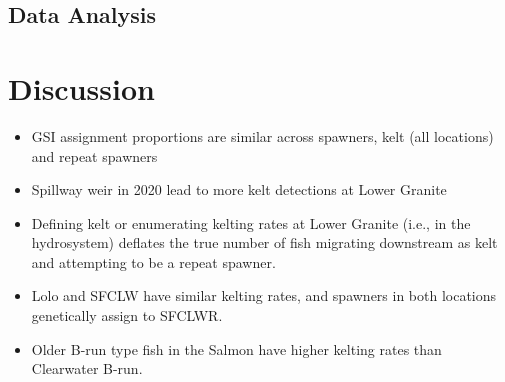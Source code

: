 \documentclass[11pt,a4paper,]{article}
\providecommand{\tightlist}{%
  \setlength{\itemsep}{0pt}\setlength{\parskip}{0pt}}
\begin{document}
\hypertarget{data-analysis}{%
\subsection{Data Analysis}\label{data-analysis}}

\hypertarget{discussion}{%
\section{Discussion}\label{discussion}}

\begin{itemize}
\tightlist
\item
  GSI assignment proportions are similar across spawners, kelt (all locations) and repeat spawners
\item
  Spillway weir in 2020 lead to more kelt detections at Lower Granite
\item
  Defining kelt or enumerating kelting rates at Lower Granite (i.e., in the hydrosystem) deflates the true number of fish migrating downstream as kelt and attempting to be a repeat spawner.
\item
  Lolo and SFCLW have similar kelting rates, and spawners in both locations genetically assign to SFCLWR.
\item
  Older B-run type fish in the Salmon have higher kelting rates than Clearwater B-run.
\end{itemize}

\newpage

\printbibliography
\end{document}
